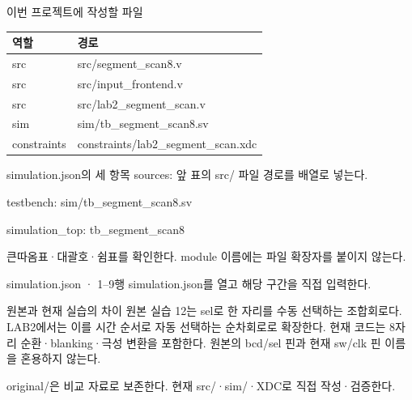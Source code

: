 \begin{frame}{이번 프로젝트에 작성할 파일}
\small
\begin{center}\renewcommand{\arraystretch}{1.55}\begin{tabular}{ll}
역할 & 경로\\\hline
src & src/segment\_scan8.v\\
src & src/input\_frontend.v\\
src & src/lab2\_segment\_scan.v\\
sim & sim/tb\_segment\_scan8.sv\\
constraints & constraints/lab2\_segment\_scan.xdc\\
\end{tabular}\end{center}
\end{frame}

\begin{frame}{simulation.json의 세 항목}
\small
sources: 앞 표의 src/ 파일 경로를 배열로 넣는다.\par\vspace{0.26cm}testbench: sim/tb\_segment\_scan8.sv\par\vspace{0.26cm}simulation\_top: tb\_segment\_scan8\par\vspace{0.26cm}큰따옴표·대괄호·쉼표를 확인한다. module 이름에는 파일 확장자를 붙이지 않는다.\par
\end{frame}

\begin{frame}{simulation.json · 1–9행}
\small
simulation.json를 열고 해당 구간을 직접 입력한다.\par\vspace{0.4cm}\par\vspace{0.4cm}
\end{frame}

\begin{frame}{원본과 현재 실습의 차이}
\small
원본 실습 12는 sel로 한 자리를 수동 선택하는 조합회로다. LAB2에서는 이를 시간 순서로 자동 선택하는 순차회로로 확장한다. 현재 코드는 8자리 순환·blanking·극성 변환을 포함한다. 원본의 bcd/sel 핀과 현재 sw/clk 핀 이름을 혼용하지 않는다.\par\vspace{0.26cm}original/은 비교 자료로 보존한다. 현재 src/·sim/·XDC로 직접 작성·검증한다.\par
\end{frame}

